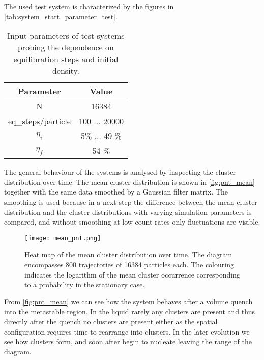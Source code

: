 The used test system is characterized by the figures in \autoref{tab:system_start_parameter_test}.

\begin{table}
\centering
\begin{tabular}{c|c}
Parameter & Value \\ \hline
N & 16384 \\
eq\_steps/particle & 100 ... 20000 \\
$\eta_i$ & 5\% ... 49 \% \\
$\eta_f$ & 54 \% \\
\end{tabular}
\caption[Simulation parameters for testing equilibration step number and initial density]{Input parameters of test systems probing the dependence on equilibration steps and initial density.}
\label{tab:system_start_parameter_test}
\end{table}

The general behaviour of the systems is analysed by inspecting the cluster distribution over time. The mean cluster distribution is shown in \autoref{fig:pnt_mean} together with the same data smoothed by a Gaussian filter matrix. The smoothing is used because in a next step the difference between the mean cluster distribution and the cluster distributions with varying simulation parameters is compared, and without smoothing at low count rates only fluctuations are visible.\\


\begin{figure}[h!]
\centering
\texttt{[image: mean\_pnt.png]}
\caption[Gaussian filter applied to p(N,t) measurement]{Heat map of the mean cluster distribution over time. The diagram encompasses 800 trajectories of 16384 particles each. The colouring indicates the logarithm of the mean cluster occurrence corresponding to a probability in the stationary case.}
\label{fig:pnt_mean}
\end{figure}

From \autoref{fig:pnt_mean} we can see how the system behaves after a volume quench into the metastable region. In the liquid rarely any clusters are present and thus directly after the quench no clusters are present either as the spatial configuration requires time to rearrange into clusters. In the later evolution we see how clusters form, and soon after begin to nucleate leaving the range of the diagram.\\

